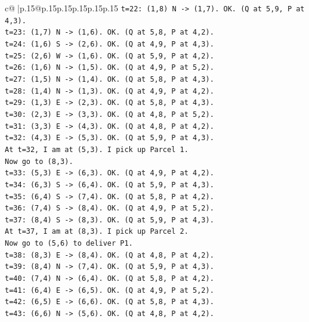 \documentclass{article}
\begin{document}
{\begin{supertabular}{c@{$\;$}|p{.15\linewidth}@{}p{.15\linewidth}p{.15\linewidth}p{.15\linewidth}p{.15\linewidth}p{.15\linewidth}}
{{{\texttt{t=22: (1,8) N {-}> (1,7). OK. (Q at 5,9, P at 4,3).} \\
\texttt{t=23: (1,7) N {-}> (1,6). OK. (Q at 5,8, P at 4,2).} \\
\texttt{t=24: (1,6) S {-}> (2,6). OK. (Q at 4,9, P at 4,3).} \\
\texttt{t=25: (2,6) W {-}> (1,6). OK. (Q at 5,9, P at 4,2).} \\
\texttt{t=26: (1,6) N {-}> (1,5). OK. (Q at 4,9, P at 5,2).} \\
\texttt{t=27: (1,5) N {-}> (1,4). OK. (Q at 5,8, P at 4,3).} \\
\texttt{t=28: (1,4) N {-}> (1,3). OK. (Q at 4,9, P at 4,2).} \\
\texttt{t=29: (1,3) E {-}> (2,3). OK. (Q at 5,8, P at 4,3).} \\
\texttt{t=30: (2,3) E {-}> (3,3). OK. (Q at 4,8, P at 5,2).} \\
\texttt{t=31: (3,3) E {-}> (4,3). OK. (Q at 4,8, P at 4,2).} \\
\texttt{t=32: (4,3) E {-}> (5,3). OK. (Q at 5,9, P at 4,3).} \\
\texttt{At t=32, I am at (5,3). I pick up Parcel 1.} \\
\texttt{Now go to (8,3).} \\
\texttt{t=33: (5,3) E {-}> (6,3). OK. (Q at 4,9, P at 4,2).} \\
\texttt{t=34: (6,3) S {-}> (6,4). OK. (Q at 5,9, P at 4,3).} \\
\texttt{t=35: (6,4) S {-}> (7,4). OK. (Q at 5,8, P at 4,2).} \\
\texttt{t=36: (7,4) S {-}> (8,4). OK. (Q at 4,9, P at 5,2).} \\
\texttt{t=37: (8,4) S {-}> (8,3). OK. (Q at 5,9, P at 4,3).} \\
\texttt{At t=37, I am at (8,3). I pick up Parcel 2.} \\
\texttt{Now go to (5,6) to deliver P1.} \\
\texttt{t=38: (8,3) E {-}> (8,4). OK. (Q at 4,8, P at 4,2).} \\
\texttt{t=39: (8,4) N {-}> (7,4). OK. (Q at 5,9, P at 4,3).} \\
\texttt{t=40: (7,4) N {-}> (6,4). OK. (Q at 5,8, P at 4,2).} \\
\texttt{t=41: (6,4) E {-}> (6,5). OK. (Q at 4,9, P at 5,2).} \\
\texttt{t=42: (6,5) E {-}> (6,6). OK. (Q at 5,8, P at 4,3).} \\
\texttt{t=43: (6,6) N {-}> (5,6). OK. (Q at 4,8, P at 4,2).} \\
}}}
\end{supertabular}}
\end{document}
